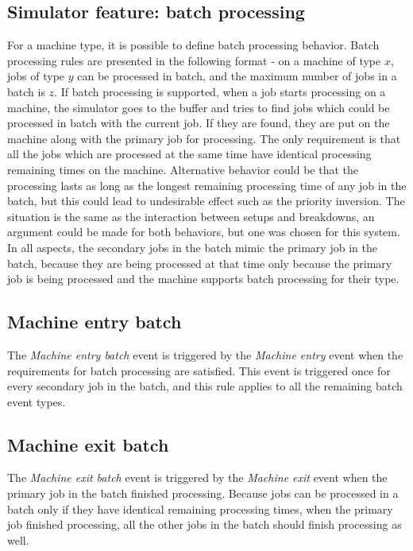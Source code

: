 \subsection{Simulator feature: batch processing}
For a machine type, it is possible to define batch processing behavior. Batch processing rules are presented in the following format - on a machine of type $x$, jobs of type $y$ can be processed in batch, and the maximum number of jobs in a batch is $z$. If batch processing is supported, when a job starts processing on a machine, the simulator goes to the buffer and tries to find jobs which could be processed in batch with the current job. If they are found, they are put on the machine along with the primary job for processing. The only requirement is that all the jobs which are processed at the same time have identical processing remaining times on the machine. Alternative behavior could be that the processing lasts as long as the longest remaining processing time of any job in the batch, but this could lead to undesirable effect such as the priority inversion. The situation is the same as the interaction between setups and breakdowns, an argument could be made for both behaviors, but one was chosen for this system. In all aspects, the secondary jobs in the batch mimic the primary job in the batch, because they are being processed at that time only because the primary job is being processed and the machine supports batch processing for their type.

\subsection{Machine entry batch}
The \textit{Machine entry batch} event is triggered by the \textit{Machine entry} event when the requirements for batch processing are satisfied. This event is triggered once for every secondary job in the batch, and this rule applies to all the remaining batch event types.

\subsection{Machine exit batch}
The \textit{Machine exit batch} event is triggered by the \textit{Machine exit} event when the primary job in the batch finished processing. Because jobs can be processed in a batch only if they have identical remaining processing times, when the primary job finished processing, all the other jobs in the batch should finish processing as well.

